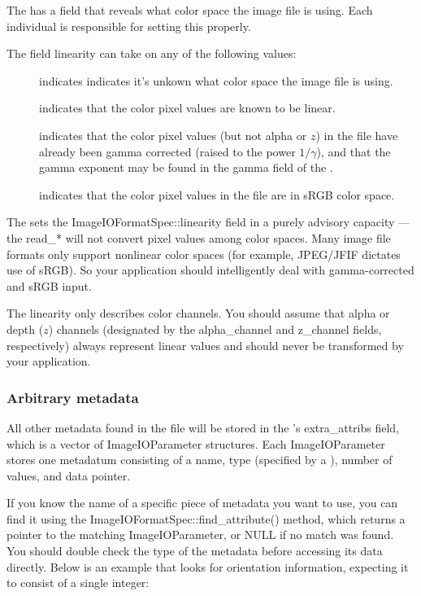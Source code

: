 The \ImageIOFormatSpec has a field that reveals what color space the
image file is using.  Each individual \ImageInput is responsible for
setting this properly.

The \ImageIOFormatSpec field {\cf linearity} can take on any of the
following values:
\begin{description}
\item[\halfspc \rm {}] indicates
  indicates it's unkown what color space the image file is using.
\item[\halfspc \rm {}] indicates that the
  color pixel values are known to be linear.
\item[\halfspc \rm {}] indicates
  that the color pixel values (but not alpha or $z$) in the file have
  already been gamma corrected (raised to the power $1/\gamma$), and
  that the gamma exponent may be found in the {\cf gamma} field of the
  \ImageIOFormatSpec.
\item[\halfspc \rm {}] indicates that the
  color pixel values in the file are in sRGB color space.
\end{description}

The \ImageInput sets the {\cf ImageIOFormatSpec::linearity} field in a
purely advisory capacity --- the {\cf read_*} will not convert pixel
values among color spaces.  Many image file formats only support
nonlinear color spaces (for example, JPEG/JFIF dictates use of sRGB).
So your application should intelligently deal with gamma-corrected and
sRGB input.

The linearity only describes color channels.  You should assume that
alpha or depth ($z$) channels (designated by the {\cf alpha_channel} and
{\cf z_channel} fields, respectively) always represent linear values and
should never be transformed by your application.

\subsubsection{Arbitrary metadata}

All other metadata found in the file will be stored in the
\ImageIOFormatSpec's {\cf extra_attribs} field, which is a vector
of {\cf ImageIOParameter} structures.  Each {\cf ImageIOParameter}
stores one metadatum consisting of a name, type (specified by 
a \ParamBaseType), number of values, and data pointer.

If you know the name of a specific piece of metadata you want to use,
you can find it using the {\cf ImageIOFormatSpec::find_attribute()}
method, which returns a pointer to the matching {\cf ImageIOParameter},
or {\cf NULL} if no match was found.  You should double check the
type of the metadata before accessing its data directly.  Below is an
example that looks for orientation information, expecting it to consist 
of a single integer:

